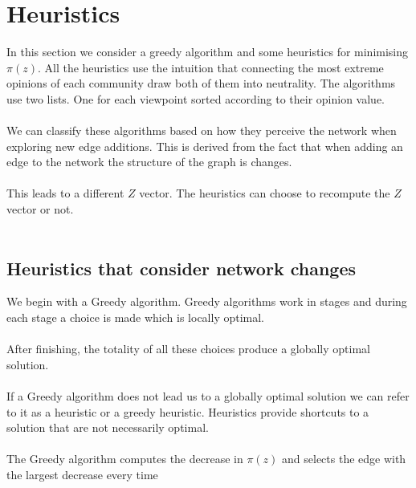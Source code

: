 \section{Heuristics}
\label{sec:heuristics}

In this section we  consider a greedy algorithm and some heuristics for minimising $\pi(z)$. All the heuristics use the intuition that connecting the most extreme opinions of each community draw both of them into neutrality. The algorithms use two lists. One for each viewpoint sorted according to their opinion value. 
\\
\\
We can classify these algorithms based on how they perceive the network when exploring new edge additions. This is derived from the fact that when adding an edge to the network the structure of the graph is changes. 
\\
\\
This leads to a different $Z$ vector. The heuristics can choose to recompute the $Z$ vector or not.
\\
\\

\subsection{Heuristics that consider network changes}
\label{sec:netChanges}

We begin with a Greedy algorithm. Greedy algorithms work in stages and during each stage a choice is made which is locally optimal.
\\
\\
After finishing, the totality of all these choices produce a globally optimal solution.
\\
\\
If a Greedy algorithm does not lead us to a globally optimal solution we can refer to it as a heuristic or a greedy heuristic. Heuristics provide shortcuts to a solution that are not necessarily optimal.
\\
\\
The Greedy algorithm computes the decrease in $\pi(z)$ and selects the edge with the largest decrease every time
\\
\\

